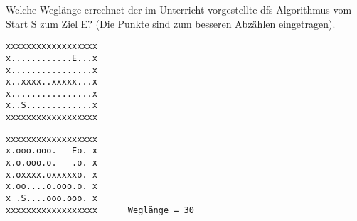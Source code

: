 \question[2]
Welche Weglänge errechnet der im Unterricht vorgestellte dfs-Algorithmus
vom Start S zum Ziel E? (Die Punkte sind zum besseren Abzählen eingetragen).
\begin{lstlisting}
xxxxxxxxxxxxxxxxxx
x............E...x
x................x
x..xxxx..xxxxx...x
x................x
x..S.............x
xxxxxxxxxxxxxxxxxx
\end{lstlisting}
\begin{solutionbox}{4cm}
\begin{lstlisting}
xxxxxxxxxxxxxxxxxx
x.ooo.ooo.   Eo. x
x.o.ooo.o.   .o. x
x.oxxxx.oxxxxxo. x
x.oo....o.ooo.o. x
x .S....ooo.ooo. x
xxxxxxxxxxxxxxxxxx      Weglänge = 30
\end{lstlisting}
\end{solutionbox}
